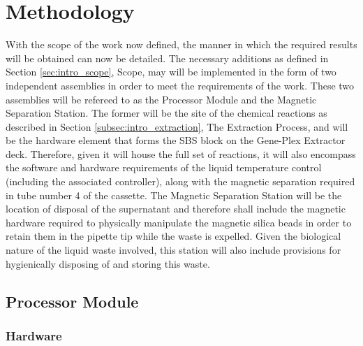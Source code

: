 \chapter{Methodology}
\label{cha:methodology}

With the scope of the work now defined, the manner in which the required results will be obtained can now be detailed. The necessary additions as defined in Section \ref*{sec:intro_scope}, Scope, may will be implemented in the form of two independent assemblies in order to meet the requirements of the work. These two assemblies will be refereed to as the Processor Module and the Magnetic Separation Station. The former will be the site of the chemical reactions as described in Section \ref{subsec:intro_extraction}, The Extraction Process, and will be the hardware element that forms the SBS block on the Gene-Plex Extractor deck. Therefore, given it will house the full set of reactions, it will also encompass the software and hardware requirements of the liquid temperature control (including the associated controller), along with the magnetic separation required in tube number 4 of the cassette. The Magnetic Separation Station will be the location of disposal of the supernatant and therefore shall include the magnetic hardware required to physically manipulate the magnetic silica beads in order to retain them in the pipette tip while the waste is expelled. Given the biological nature of the liquid waste involved, this station will also include provisions for hygienically disposing of and storing this waste.

\section{Processor Module}

\subsection{Hardware}


